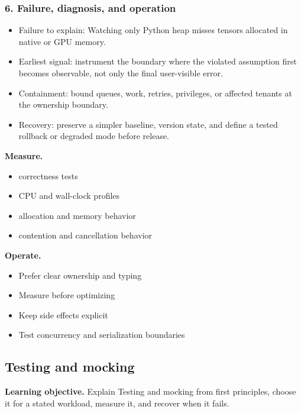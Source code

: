 \subsubsection*{6. Failure, diagnosis, and operation}
\begin{itemize}
\item Failure to explain: Watching only Python heap misses tensors allocated in native or GPU memory.
\item Earliest signal: instrument the boundary where the violated assumption first becomes observable, not only the final user-visible error.
\item Containment: bound queues, work, retries, privileges, or affected tenants at the ownership boundary.
\item Recovery: preserve a simpler baseline, version state, and define a tested rollback or degraded mode before release.
\end{itemize}
\textbf{Measure.}\begin{itemize}
\item correctness tests
\item CPU and wall-clock profiles
\item allocation and memory behavior
\item contention and cancellation behavior
\end{itemize}
\textbf{Operate.}\begin{itemize}
\item Prefer clear ownership and typing
\item Measure before optimizing
\item Keep side effects explicit
\item Test concurrency and serialization boundaries
\end{itemize}
\subsection{Testing and mocking}
\textbf{Learning objective.} Explain Testing and mocking from first principles, choose it for a stated workload, measure it, and recover when it fails.
